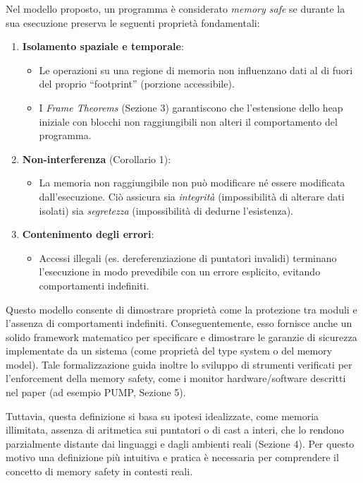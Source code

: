 Nel modello proposto, un programma è considerato \textit{memory safe} se durante
la sua esecuzione preserva le seguenti proprietà fondamentali:
\begin{enumerate}
  \item \textbf{Isolamento spaziale e temporale}:
    \begin{itemize}
      \item Le operazioni su una regione di memoria non influenzano dati al di fuori
        del proprio ``footprint'' (porzione accessibile).

      \item I \textit{Frame Theorems} (Sezione 3) garantiscono che l'estensione
        dello heap iniziale con blocchi non raggiungibili non alteri il
        comportamento del programma.
    \end{itemize}

  \item \textbf{Non-interferenza} (Corollario 1):
    \begin{itemize}
      \item La memoria non raggiungibile non può modificare né essere modificata
        dall'esecuzione. Ciò assicura sia \textit{integrità} (impossibilità di
        alterare dati isolati) sia \textit{segretezza} (impossibilità di dedurne
        l'esistenza).
    \end{itemize}

  \item \textbf{Contenimento degli errori}:
    \begin{itemize}
      \item Accessi illegali (es. dereferenziazione di puntatori invalidi)
        terminano l'esecuzione in modo prevedibile con un errore esplicito, evitando
        comportamenti indefiniti.
    \end{itemize}
\end{enumerate}

Questo modello consente di dimostrare proprietà come la protezione tra moduli e
l'assenza di comportamenti indefiniti. Conseguentemente, esso fornisce anche un
solido framework matematico per specificare e dimostrare le garanzie di
sicurezza implementate da un sistema (come proprietà del type system o del memory
model). Tale formalizzazione guida inoltre lo sviluppo di strumenti verificati per
l'enforcement della memory safety, come i monitor hardware/software descritti
nel paper (ad esempio PUMP, Sezione 5).

Tuttavia, questa definizione si basa su ipotesi idealizzate, come memoria illimitata,
assenza di aritmetica sui puntatori o di cast a interi, che lo rendono parzialmente
distante dai linguaggi e dagli ambienti reali (Sezione 4). Per questo motivo una
definizione più intuitiva e pratica è necessaria per comprendere il concetto di
memory safety in contesti reali.

